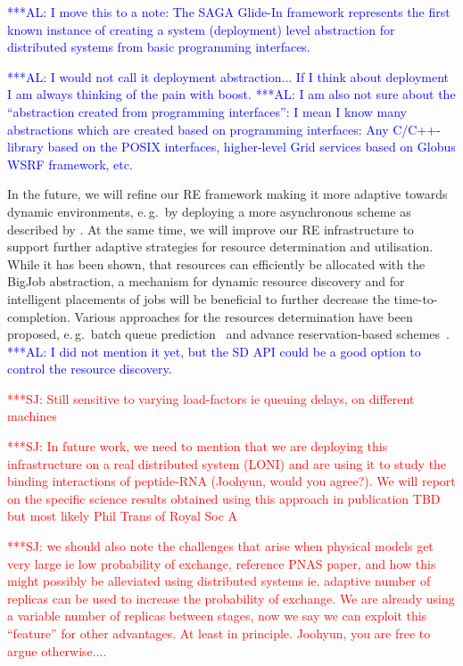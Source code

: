 \documentclass{rspublic}
\newcommand{\alnote}[1]{ {\textcolor{blue} { ***AL: #1 }}}
\newcommand{\jhanote}[1]{ {\textcolor{red} { ***SJ: #1 }}}
\newcommand{\alnote}[1]{}
\newcommand{\jhanote}[1]{}
\newcommand{\glidein}[1]{Glide-In }
\begin{document}
\alnote{I move this to a note: The SAGA \glidein\ framework represents
  the first known instance of creating a system (deployment) level
  abstraction for distributed systems from basic programming
  interfaces.}

\alnote{I would not call it deployment abstraction... If I think about
deployment I am always thinking of the pain with boost.}
\alnote{I am also not sure about the ``abstraction created from 
  programming interfaces'': 
  I mean I know many abstractions which are created based on
  programming interfaces: Any C/C++-library based on the POSIX
  interfaces, higher-level Grid services based on Globus WSRF
  framework, etc.}   

In the future, we will refine our RE framework making it
more adaptive towards dynamic environments, e.\,g.\ by deploying  
a more asynchronous scheme as described by \citet{Gallicchio:2007yq}.
At the same time, we will improve our RE infrastructure to support
further adaptive strategies for resource determination and
utilisation.  While it has been shown, that resources can efficiently
be allocated with the BigJob abstraction, a mechanism for dynamic
resource discovery and for intelligent placements of jobs will be
beneficial to further decrease the time-to-completion.  Various
approaches for the resources determination have been proposed, e.\,g.\
batch queue prediction~\citep{1254939,Chakraborty:2008nx} and advance
reservation-based schemes~\citep{Jeske:2007wj}.  \alnote{I did not
  mention it yet, but the SD API could be a good option to control the
  resource discovery.}

\jhanote{Still sensitive to varying load-factors ie queuing delays, on
  different machines}

\jhanote{In future work, we need to mention that we are deploying this
  infrastructure on a real distributed system (LONI) and are using it
  to study the binding interactions of peptide-RNA (Joohyun, would you
  agree?). We will report on the specific science results obtained
  using this approach in publication TBD but most likely Phil Trans of
  Royal Soc A}

\jhanote{we should also note the challenges that arise when physical
  models get very large ie low probability of exchange, reference PNAS
  paper, and how this might possibly be alleviated using distributed
  systems ie. adaptive number of replicas can be used to increase the
  probability of exchange. We are already using a variable number of
  replicas between stages, now we say we can exploit this ``feature''
  for other advantages. At least in principle.  Joohyun, you are free
  to argue otherwise....}
\end{document}
